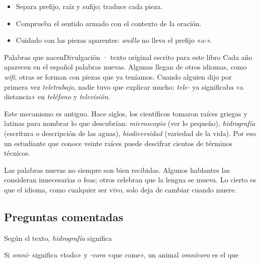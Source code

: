 
\begin{regla}
\begin{itemize}
  \item Separa prefijo, raíz y sufijo; traduce cada pieza.
  \item Comprueba el sentido armado con el contexto de la oración.
  \item Cuidado con las piezas aparentes: \emph{anillo} no lleva el prefijo «a-».
\end{itemize}
\end{regla}

\begin{texto}{Palabras que nacen}{Divulgación · texto original escrito para este libro}
\pa Cada año aparecen en el español palabras nuevas. Algunas llegan de otros idiomas, como \emph{wifi}; otras se forman con
piezas que ya teníamos. Cuando alguien dijo por primera vez \emph{teletrabajo}, nadie tuvo que explicar mucho: \emph{tele-}
ya significaba «a distancia» en \emph{teléfono} y \emph{televisión}.

\pa Este mecanismo es antiguo. Hace siglos, los científicos tomaron raíces griegas y latinas para nombrar lo que
descubrían: \emph{microscopio} (ver lo pequeño), \emph{hidrografía} (escritura o descripción de las aguas),
\emph{biodiversidad} (variedad de la vida). Por eso un estudiante que conoce veinte raíces puede descifrar cientos de
términos técnicos.

\pa Las palabras nuevas no siempre son bien recibidas. Algunos hablantes las consideran innecesarias o feas; otros
celebran que la lengua se mueva. Lo cierto es que el idioma, como cualquier ser vivo, solo deja de cambiar cuando muere.
\end{texto}

\subsection{Preguntas comentadas}
\begin{comentada}{Según el texto, \emph{hidrografía} significa}
\end{comentada}

\begin{reto}
Si \emph{omni-} significa «todo» y \emph{-voro} «que come», un animal \emph{omnívoro} es el que
\end{reto}

